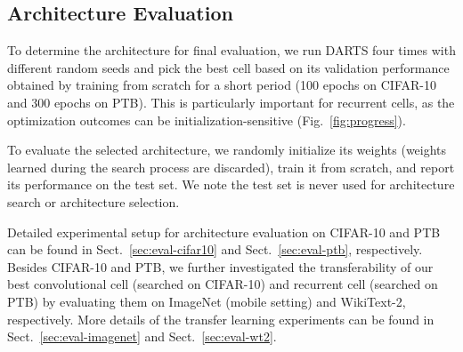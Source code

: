 \documentclass{article}
\begin{document}
\subsection{Architecture Evaluation}
\label{sec:sec:experiment-eval}
To determine the architecture for final evaluation,
we run DARTS four times with different random seeds and pick the best cell based on its validation performance obtained by training from scratch for a short period (100 epochs on CIFAR-10 and 300 epochs on PTB).
This is particularly important for recurrent cells,
as the optimization outcomes can be initialization-sensitive (Fig.~\ref{fig:progress}).

To evaluate the selected architecture,
we randomly initialize its weights (weights learned during the search process are discarded),
train it from scratch,
and report its performance on the test set.
We note the test set is never used for architecture search or architecture selection.

Detailed experimental setup for architecture evaluation on CIFAR-10 and PTB can be found in Sect.~\ref{sec:eval-cifar10} and Sect.~\ref{sec:eval-ptb}, respectively. Besides CIFAR-10 and PTB,
we further investigated the transferability of our best convolutional cell (searched on CIFAR-10) and recurrent cell (searched on PTB) by evaluating them on ImageNet (mobile setting) and WikiText-2, respectively. More details of the transfer learning experiments can be found in Sect.~\ref{sec:eval-imagenet} and Sect.~\ref{sec:eval-wt2}.
\end{document}
